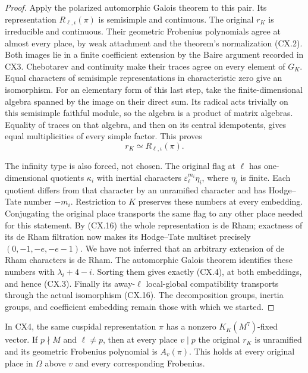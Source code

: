 \begin{proof}
Apply the polarized automorphic Galois theorem to this pair.
Its representation $R_{\ell,\iota}(\pi)$ is semisimple and
continuous.  The original $r_K$ is irreducible and continuous.
Their geometric Frobenius polynomials agree at almost every
place, by weak attachment and the theorem's normalization
(CX.2).  Both images lie in a finite coefficient extension by
the Baire argument recorded in CX3.  Chebotarev and continuity
make their traces agree on every element of $G_K$.
Equal characters of semisimple representations in
characteristic zero give an isomorphism.  For an elementary
form of this last step, take the finite-dimensional algebra
spanned by the image on their direct sum.  Its radical acts
trivially on this semisimple faithful module, so the algebra
is a product of matrix algebras.  Equality of traces on that
algebra, and then on its central idempotents, gives equal
multiplicities of every simple factor.  This proves
\[
                      r_K\simeq R_{\ell,\iota}(\pi).
                                                               \tag{CX.16}
\]

The infinity type is also forced, not chosen.  The original
flag at $\ell$ has one-dimensional quotients $\kappa_i$ with
inertial characters $\varepsilon_\ell^{m_i}\eta_i$, where
$\eta_i$ is finite.  Each quotient differs from that character
by an unramified character and has Hodge--Tate number $-m_i$.
Restriction to $K$ preserves these numbers at every embedding.
Conjugating the original place transports the same flag to
any other place needed for this statement.  By (CX.16) the
whole representation is de Rham; exactness of its de Rham
filtration now makes its Hodge--Tate multiset precisely
$(0,-1,-e,-e-1)$.  We have not inferred that an arbitrary
extension of de Rham characters is de Rham.
The automorphic Galois theorem identifies these numbers with
$\lambda_i+4-i$.  Sorting them gives exactly (CX.4), at both
embeddings, and hence (CX.3).  Finally its away-$\ell$
local-global compatibility transports through the actual
isomorphism (CX.16).  The decomposition groups, inertia
groups, and coefficient embedding remain those with which
we started.
\end{proof}

\begin{proposition}
\label{claim:CX5}
In CX4, the same cuspidal representation $\pi$ has a nonzero
$K_K(M^7)$-fixed vector.  If $p\nmid M$ and $\ell\ne p$, then
at every place $v\mid p$ the original $r_K$ is unramified and
its geometric Frobenius polynomial is $A_v(\pi)$.  This holds
at every original place in $\Omega$ above $v$ and every
corresponding Frobenius.
\end{proposition}

